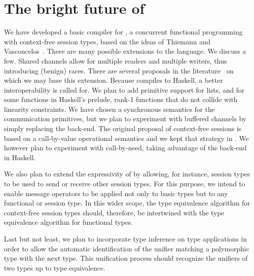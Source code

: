 \section{The bright future of \freest{}}
\label{sec:conclusion}

We have developed a basic compiler for \freest, a concurrent
functional programming with context-free session types, based on the
ideas of Thiemann and Vasconcelos~\cite{DBLP:conf/icfp/ThiemannV16}.
%
There are many possible extensions to the language. We discuss a
few. Shared channels allow for multiple readers and multiple writers,
thus introducing (benign) races. There are several proposals in the
literature~\cite{DBLP:journals/pacmpl/BalzerP17,
  DBLP:conf/sefm/FrancoV13,Lindley.Morris_Lightweight.functional.session.types,DBLP:journals/iandc/Vasconcelos12}
on which we may base this extension.
%
Because \freest{} compiles to Haskell, a better interoperability is
called for. We plan to add primitive support for lists, and for some
functions in Haskell's prelude, rank-1 functions that do not collide
with linearity constraints.
%
We have chosen a synchronous semantics for the communication
primitives, but we plan to experiment with buffered channels by simply
replacing the back-end.
%
The original proposal of context-free sessions is based on a
call-by-value operational semantics and we kept that strategy in
\freest. We however plan to experiment with call-by-need, taking
advantage of the back-end in Haskell. 

We also plan to extend the expressivity of \freest{}
by allowing, for instance, session types to be used to 
send or receive other session types. 
For this purpose, we intend to enable 
message operators to be applied not only to basic
types but to any functional or session type.
In this wider scope, 
the type equivalence algorithm for context-free session 
types should, therefore, be intertwined with the type equivalence
algorithm for functional types.

Last but not least, we plan to incorporate type inference on type 
applications in order to allow the automatic identification of the
unifier matching a polymorphic type with the next type. This 
unification process should recognize the unifiers of two types 
up to type equivalence.

